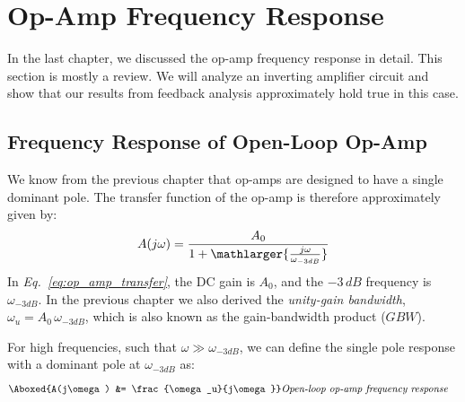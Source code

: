 \section{Op-Amp Frequency Response}
In the last chapter, we discussed the op-amp frequency response in detail. This section is mostly a review.  We will analyze an inverting amplifier circuit and show that our results from feedback analysis approximately hold true in this case.
\subsection{Frequency Response of Open-Loop Op-Amp}
We know from the previous chapter that op-amps are designed to have a single dominant pole.  The transfer function of the op-amp is therefore approximately given by:
    \begin{equation} 
        A(j\omega) = \frac{A_0}{1 + \mathlarger{\frac{j\omega}{\omega_{-3dB}}}}
        \label{eq:op_amp_transfer}
    \end{equation}
In \emph{Eq.~\ref{eq:op_amp_transfer}}, the DC gain is $A_0$, and the $-3\,dB$ frequency is $\omega_{-3dB}$.  In the previous chapter we also derived the \textit{unity-gain bandwidth}, $\omega_u = A_0\,\omega_{-3dB}$, which is also known as the  gain-bandwidth product ($GBW$).

For high frequencies, such that $\omega \gg \omega_{-3dB}$, we can define the single pole response with a dominant pole at $\omega_{-3dB}$ as:
    \begin{align}
        \Aboxed{A(j\omega) &= \frac{\omega_u}{j\omega}}
        &\textit{Open-loop op-amp frequency response}
        \label{eq:open_loop_response}
    \end{align}
